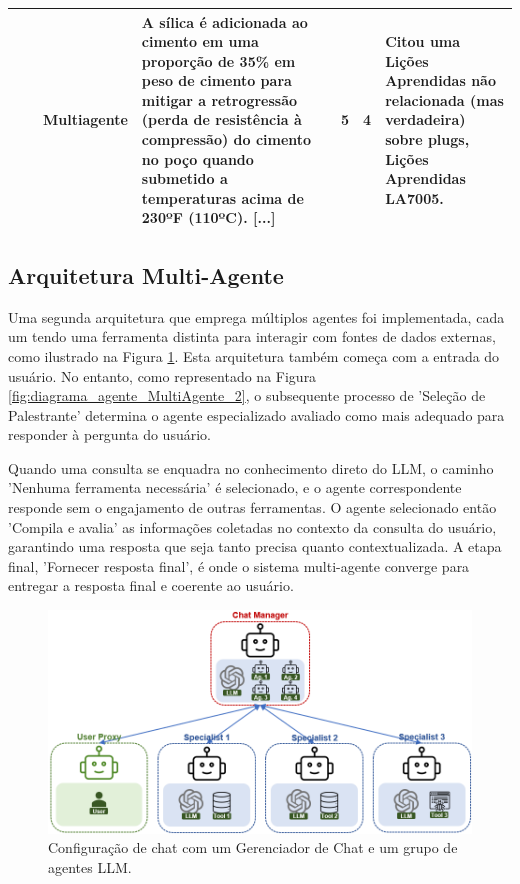 \begin{adjustwidth}{-2cm}{-2cm}
\begin{table}[ht]
\begin{tabular}{p{2cm}p{1cm}p{1cm}p{6cm}p{1.3cm}p{1.2cm}p{2cm}}
            \cmidrule{3-7} 
             & & Multiagente & A sílica é adicionada ao cimento em uma proporção de 35\% em peso de cimento para mitigar a retrogressão (perda de resistência à compressão) do cimento no poço quando submetido a temperaturas acima de 230ºF (110ºC). [...] & 5 & 4 & Citou uma Lições Aprendidas não relacionada (mas verdadeira) sobre plugs, Lições Aprendidas LA7005. \\ 
            \bottomrule 
            \end{tabular} 
            \end{table}         
            \end{adjustwidth} 
    
    
            \subsection{Arquitetura Multi-Agente}        
            
                Uma segunda arquitetura que emprega múltiplos agentes foi implementada, cada um tendo uma ferramenta distinta para interagir com fontes de dados externas, como ilustrado na Figura \ref{fig:agent_config_2}. 
                Esta arquitetura também começa com a entrada do usuário. No entanto, como representado na Figura \ref{fig:diagrama_agente_MultiAgente_2}, o subsequente processo de 'Seleção de Palestrante' determina o agente especializado avaliado como mais adequado para responder à pergunta do usuário.            
                
                Quando uma consulta se enquadra no conhecimento direto do LLM, o caminho 'Nenhuma ferramenta necessária' é selecionado, e o agente correspondente responde sem o engajamento de outras ferramentas.
                O agente selecionado então 'Compila e avalia' as informações coletadas no contexto da consulta do usuário, garantindo uma resposta que seja tanto precisa quanto contextualizada. A etapa final, 'Fornecer resposta final', é onde o sistema multi-agente converge para entregar a resposta final e coerente ao usuário.
                    
                \begin{figure}[h]
                    \centering
                    \includegraphics[width=.75\textwidth]{images/agent_config_2.png}
                    \caption{Configuração de chat com um Gerenciador de Chat e um grupo de agentes LLM.}
                    \label{fig:agent_config_2}
                \end{figure}            
                
